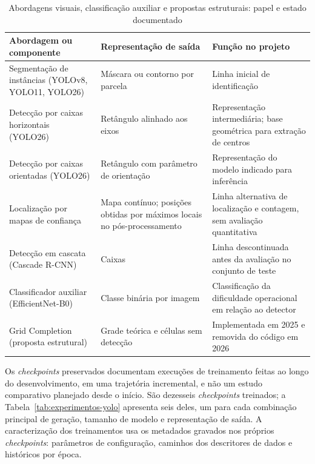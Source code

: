 \begin{table}[htb]
\centering
\caption{Abordagens visuais, classifica\c{c}\~ao auxiliar e propostas estruturais: papel e estado documentado}
\label{tab:abordagens-papel}
\small
\begin{tabular}{p{4cm}p{4.3cm}p{6.4cm}}
\hline
\textbf{Abordagem ou componente} & \textbf{Representa\c{c}\~ao de sa\'ida} & \textbf{Fun\c{c}\~ao no projeto} \\
\hline
Segmenta\c{c}\~ao de inst\^ancias (YOLOv8, YOLO11, YOLO26) & M\'ascara ou contorno por parcela & Linha inicial de identifica\c{c}\~ao \\
Detec\c{c}\~ao por caixas horizontais (YOLO26) & Ret\^angulo alinhado aos eixos & Representa\c{c}\~ao intermedi\'aria; base geom\'etrica para extra\c{c}\~ao de centros \\
Detec\c{c}\~ao por caixas orientadas (YOLO26) & Ret\^angulo com par\^ametro de orienta\c{c}\~ao & Representa\c{c}\~ao do modelo indicado para infer\^encia \\
Localiza\c{c}\~ao por mapas de confian\c{c}a & Mapa cont\'inuo; posi\c{c}\~oes obtidas por m\'aximos locais no p\'os-processamento & Linha alternativa de localiza\c{c}\~ao e contagem, sem avalia\c{c}\~ao quantitativa \\
Detec\c{c}\~ao em cascata (Cascade R-CNN) & Caixas & Linha descontinuada antes da avalia\c{c}\~ao no conjunto de teste \\
Classificador auxiliar (EfficientNet-B0) & Classe bin\'aria por imagem & Classifica\c{c}\~ao da dificuldade operacional em rela\c{c}\~ao ao detector \\
Grid Completion (proposta estrutural) & Grade te\'orica e c\'elulas sem detec\c{c}\~ao & Implementada em 2025 e removida do c\'odigo em 2026 \\
\hline
\end{tabular}
\end{table}

Os \textit{checkpoints} preservados documentam execu\c{c}\~oes de treinamento feitas ao longo do desenvolvimento, em uma trajet\'oria incremental, e n\~ao um estudo comparativo planejado desde o in\'icio. S\~ao dezesseis \textit{checkpoints} treinados; a Tabela~\ref{tab:experimentos-yolo} apresenta seis deles, um para cada combina\c{c}\~ao principal de gera\c{c}\~ao, tamanho de modelo e representa\c{c}\~ao de sa\'ida. A caracteriza\c{c}\~ao dos treinamentos usa os metadados gravados nos pr\'oprios \textit{checkpoints}: par\^ametros de configura\c{c}\~ao, caminhos dos descritores de dados e hist\'oricos por \'epoca.

